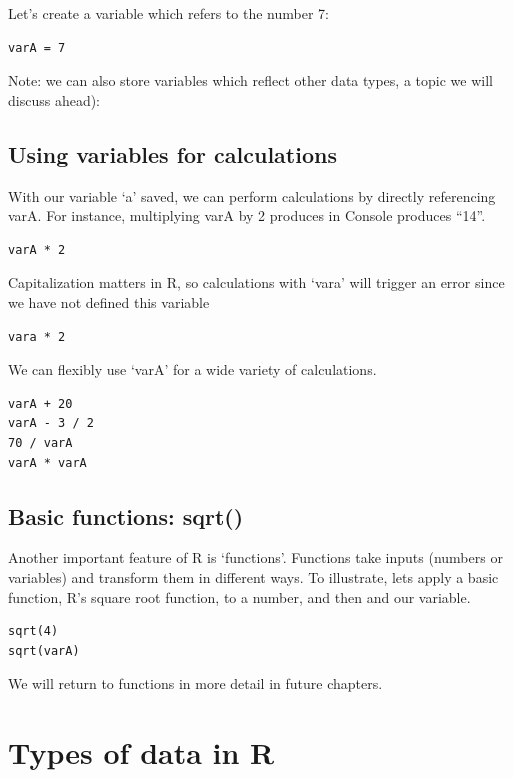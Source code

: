 \documentclass[
]{book}
\begin{document}
Let's create a variable which refers to the number 7:

\begin{verbatim}
varA = 7
\end{verbatim}

Note: we can also store variables which reflect other data types, a topic we will discuss ahead):

\hypertarget{using-variables-for-calculations}{%
\section{Using variables for calculations}\label{using-variables-for-calculations}}

With our variable `a' saved, we can perform calculations by directly referencing varA. For instance, multiplying varA by 2 produces in Console produces ``14''.

\begin{verbatim}
varA * 2
\end{verbatim}

Capitalization matters in R, so calculations with `vara' will trigger an error since we have not defined this variable

\begin{verbatim}
vara * 2
\end{verbatim}

We can flexibly use `varA' for a wide variety of calculations.

\begin{verbatim}
varA + 20
varA - 3 / 2
70 / varA
varA * varA
\end{verbatim}

\hypertarget{basic-functions-sqrt}{%
\section{Basic functions: sqrt()}\label{basic-functions-sqrt}}

Another important feature of R is `functions'. Functions take inputs (numbers or variables) and transform them in different ways. To illustrate, lets apply a basic function, R's square root function, to a number, and then and our variable.

\begin{verbatim}
sqrt(4)
sqrt(varA)
\end{verbatim}

We will return to functions in more detail in future chapters.

\hypertarget{types-of-data-in-r}{%
\chapter{Types of data in R}\label{types-of-data-in-r}}
\end{document}
